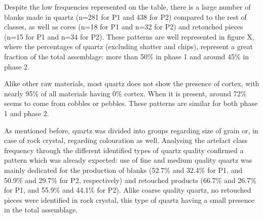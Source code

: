 \documentclass[12pt,twoside]{reedthesis}
\begin{document}
Despite the low frequencies represented on the table, there is a large number of blanks made in quartz (n=281 for P1 and 438 for P2) compared to the rest of classes, as well as cores (n=18 for P1 and n=32 for P2) and retouched pieces (n=15 for P1 and n=34 for P2). These patterns are well represented in figure X, where the percentages of quartz (excluding shatter and chips), represent a great fraction of the total assemblage: more than 50\% in phase 1 and around 45\% in phase 2.

Alike other raw materials, most quartz does not show the presence of cortex, with nearly 95\% of all materials having 0\% cortex. When it is present, around 72\% seems to come from cobbles or pebbles. These patterns are similar for both phase 1 and phase 2.

As mentioned before, quartz was divided into groups regarding size of grain or, in case of rock crystal, regarding colouration as well. Analysing the artefact class frequency through the different identified types of quartz quality confirmed a pattern which was already expected: use of fine and medium quality quartz was mainly dedicated for the production of blanks (52.7\% and 32.4\% for P1, and 50.9\% and 29.7\% for P2, respectively) and retouched products (66.7\% and 26.7\% for P1, and 55.9\% and 44.1\% for P2). Alike coarse quality quartz, no retouched pieces were identified in rock crystal, this type of quartz having a small presence in the total assemblage.
\begin{table}[!h]

\caption{\label{tab:quartzquality1}Quartz quality by class (Phase 1).}
\centering
{}
\end{table}
\end{document}
